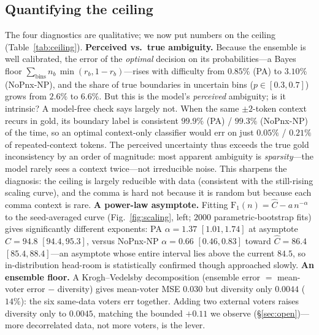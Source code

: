 \subsection{Quantifying the ceiling}\label{sec:ceiling}
The four diagnostics are qualitative; we now put numbers on the ceiling
(Table~\ref{tab:ceiling}). \textbf{Perceived vs.\ true ambiguity.} Because the
ensemble is well calibrated, the error of the \emph{optimal} decision on its
probabilities---a Bayes floor $\sum_{\text{bins}} n_b\,\min(r_b,1{-}r_b)$---rises with
difficulty from $0.85\%$ (PA) to $3.10\%$ (NoPnx-NP), and the share of true boundaries
in uncertain bins ($p\in[0.3,0.7]$) grows from $2.6\%$ to $6.6\%$. But this is the
model's \emph{perceived} ambiguity; is it intrinsic? A model-free check says largely
not. When the same $\pm2$-token context recurs in gold, its boundary label is
consistent $99.9\%$ (PA) / $99.3\%$ (NoPnx-NP) of the time, so an optimal context-only
classifier would err on just $0.05\%$ / $0.21\%$ of repeated-context tokens. The
perceived uncertainty thus exceeds the true gold inconsistency by an order of
magnitude: most apparent ambiguity is \emph{sparsity}---the model rarely sees a
context twice---not irreducible noise. This sharpens the diagnosis: the ceiling is
largely reducible with data (consistent with the still-rising scaling curve), and the
comma is hard not because it is random but because each comma context is rare.
\textbf{A power-law asymptote.} Fitting $\mathrm{F}_1(n)=\hat C-a\,n^{-\alpha}$ to the
seed-averaged curve (Fig.~\ref{fig:scaling}, left; $2000$ parametric-bootstrap fits)
gives significantly different exponents: PA $\alpha{=}1.37$ $[1.01,1.74]$ at asymptote
$\hat C{=}94.8$ $[94.4,95.3]$, versus NoPnx-NP $\alpha{=}0.66$ $[0.46,0.83]$ toward
$\hat C{=}86.4$ $[85.4,88.4]$---an asymptote whose entire interval lies above the
current $84.5$, so in-distribution head-room is statistically confirmed though
approached slowly. \textbf{An ensemble floor.} A Krogh--Vedelsby decomposition
(ensemble error $=$ mean-voter error $-$ diversity) gives mean-voter MSE $0.030$ but
diversity only $0.0044$ ($14\%$): the six same-data voters err together. Adding two
external voters raises diversity only to $0.0045$, matching the bounded $+0.11$ \fone{}
we observe (\S\ref{sec:open})---more decorrelated data, not more voters, is the lever.

